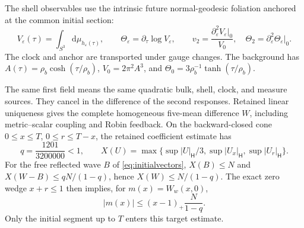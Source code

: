 \documentclass[11pt]{article}
\newcommand{\eps}{\varepsilon}
\newcommand{\dd}{\mathrm d}
\begin{document}
The shell observables use the intrinsic future normal-geodesic foliation
anchored at the common initial section:
\begin{equation}
 V_\eps(\tau)=\int_{S^3}\dd\mu_{h_\eps(\tau)},\qquad
 \Theta_\eps=\partial_\tau\log V_\eps,\qquad
 v_2=\frac{\partial_\eps^2V_\eps|_0}{V_0},\quad
 \Theta_2=\partial_\eps^2\Theta_\eps|_0.
 \label{eq:observables}
\end{equation}
The clock and anchor are transported under gauge changes. The background
has $A(\tau)=\rho_b\cosh(\tau/\rho_b)$, $V_0=2\pi^2A^3$, and
$\Theta_0=3\rho_b^{-1}\tanh(\tau/\rho_b)$.

The same first field means the same quadratic bulk, shell, clock, and
measure sources. They cancel in the difference of the second responses.
Retained linear uniqueness gives the complete homogeneous five-mean
difference $W$, including metric--scalar coupling and Robin feedback.
On the backward-closed cone $0\le x\le T$, $0\le r\le T-x$, the retained
coefficient estimate has
\begin{equation}
 q=\frac{1201}{3200000}<1,\qquad
 X(U)=\max\{\sup|U|_{\mathsf H}/3,
                   \sup|U_x|_{\mathsf H},\sup|U_r|_{\mathsf H}\}.
 \label{eq:resolvent}
\end{equation}
For the free reflected wave $B$ of \eqref{eq:initialvectors},
$X(B)\le N$ and $X(W-B)\le qN/(1-q)$, hence $X(W)\le N/(1-q)$.
The exact zero wedge $x+r\le1$ then implies, for $m(x)=W_w(x,0)$,
\begin{equation}
 |m(x)|\le (x-1)_+\frac{N}{1-q}.
 \label{eq:zero-wedge}
\end{equation}
Only the initial segment up to $T$ enters this target estimate.
\end{document}
